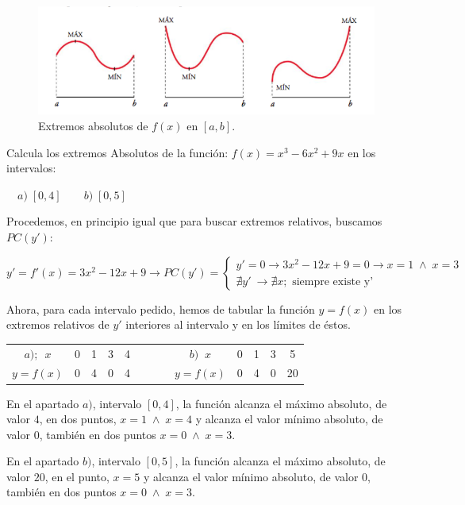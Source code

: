 	
	\begin{figure}[H]
		\centering
		\includegraphics[width=1\textwidth]{imagenes/imagenes05/T05IM08.png}
		\caption{Extremos absolutos de $f(x)$ en $[a,b]$.}
	\end{figure}
	
	
	\begin{ejem} Calcula los extremos Absolutos de la función:  $f(x)=x^3-6x^2+9x$ en los intervalos:
	
	$\quad a)\; [0,4] \qquad b)\; [0,5]$
	
	Procedemos, en principio igual que para buscar extremos relativos, buscamos $PC(y')$:
	
	$y'=f'(x)=3x^2-12 x+9 \to PC(y') =\begin{cases}
	y'=0 \to 3x^2-12x+9=0 \to x=1 \; \wedge \; x=3 \\
	\nexists y' \ \to  \nexists x ; \mbox{ siempre existe y'}
	\end{cases}$
	
	Ahora, para cada intervalo pedido, hemos de tabular la función $y=f(x)$ en los extremos relativos de $y'$ interiores al intervalo y en los límites de éstos.
	
	\begin{table}[H]
	\centering
	\begin{tabular}{|c|c|c|c|c|c|c|c|c|c|c|}
	\cline{1-5} \cline{7-11}
	 $a);\ \;  x$& 0& 1 & 3 & 4 & $\qquad$ & $b)\; \;  x$ & 0 & 1 & 3  & 5 \\ \cline{1-5} \cline{7-11} 
 	$y=f(x)$& 0 & 4 & 0 & 4 & $\qquad$ &$ y=f(x)$  & 0 & 4 & 0 & 20 \\ \cline{1-5} \cline{7-11} 
	\end{tabular}
	\end{table}
	
	En el apartado $a)$, intervalo $[0,4]$, la función alcanza el máximo absoluto, de valor $4$, en dos puntos, $x=1 \; \wedge \; x=4$ y alcanza el valor mínimo absoluto, de valor $0$, también en dos puntos $x=0\; \wedge \; x=3$.
	
	En el apartado $b)$, intervalo $[0,5]$, la función alcanza el máximo absoluto, de valor $20$, en el punto, $x=5$ y alcanza el valor mínimo absoluto, de valor $0$, también en dos puntos $x=0\; \wedge \; x=3$.
	
	\end{ejem}
	
